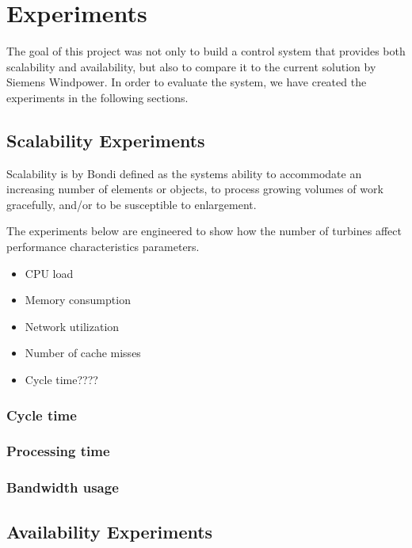 
\chapter{Experiments}
The goal of this project was not only to build a control system that provides both scalability and availability, but also to compare it to the current solution by Siemens Windpower. 
In order to evaluate the system, we have created the experiments in the following sections.


\section{Scalability Experiments}
Scalability is by Bondi\cite{Bondi:2000:CSI:350391.350432} defined as the systems ability to accommodate an increasing number of elements or objects, to process growing volumes of work gracefully, and/or to be susceptible to enlargement. 

The experiments below are engineered to show how the number of turbines affect performance characteristics parameters.

\begin{itemize}
	\item CPU load
	\item Memory consumption
	\item Network utilization
	\item Number of cache misses
	\item Cycle time????
\end{itemize}

\subsection{Cycle time}

\subsection{Processing time}

\subsection{Bandwidth usage}

\section{Availability Experiments}